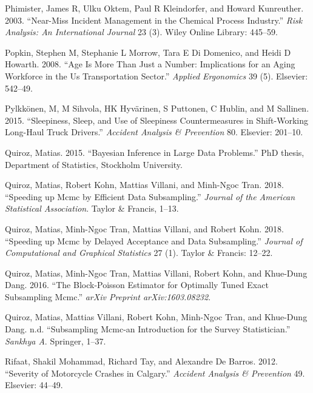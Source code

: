 \documentclass[12pt]{book}
\numberwithin{equation}{chapter}
\begin{document}
\leavevmode\hypertarget{ref-phimister2003near}{}%
Phimister, James R, Ulku Oktem, Paul R Kleindorfer, and Howard Kunreuther. 2003. ``Near-Miss Incident Management in the Chemical Process Industry.'' \emph{Risk Analysis: An International Journal} 23 (3). Wiley Online Library: 445--59.

\leavevmode\hypertarget{ref-popkin2008age}{}%
Popkin, Stephen M, Stephanie L Morrow, Tara E Di Domenico, and Heidi D Howarth. 2008. ``Age Is More Than Just a Number: Implications for an Aging Workforce in the Us Transportation Sector.'' \emph{Applied Ergonomics} 39 (5). Elsevier: 542--49.

\leavevmode\hypertarget{ref-pylkkonen2015sleepiness}{}%
Pylkkönen, M, M Sihvola, HK Hyvärinen, S Puttonen, C Hublin, and M Sallinen. 2015. ``Sleepiness, Sleep, and Use of Sleepiness Countermeasures in Shift-Working Long-Haul Truck Drivers.'' \emph{Accident Analysis \& Prevention} 80. Elsevier: 201--10.

\leavevmode\hypertarget{ref-quiroz2015bayesian}{}%
Quiroz, Matias. 2015. ``Bayesian Inference in Large Data Problems.'' PhD thesis, Department of Statistics, Stockholm University.

\leavevmode\hypertarget{ref-quiroz2018speeding1}{}%
Quiroz, Matias, Robert Kohn, Mattias Villani, and Minh-Ngoc Tran. 2018. ``Speeding up Mcmc by Efficient Data Subsampling.'' \emph{Journal of the American Statistical Association}. Taylor \& Francis, 1--13.

\leavevmode\hypertarget{ref-quiroz2018speeding}{}%
Quiroz, Matias, Minh-Ngoc Tran, Mattias Villani, and Robert Kohn. 2018. ``Speeding up Mcmc by Delayed Acceptance and Data Subsampling.'' \emph{Journal of Computational and Graphical Statistics} 27 (1). Taylor \& Francis: 12--22.

\leavevmode\hypertarget{ref-quiroz2016block}{}%
Quiroz, Matias, Minh-Ngoc Tran, Mattias Villani, Robert Kohn, and Khue-Dung Dang. 2016. ``The Block-Poisson Estimator for Optimally Tuned Exact Subsampling Mcmc.'' \emph{arXiv Preprint arXiv:1603.08232}.

\leavevmode\hypertarget{ref-quirozsubsampling}{}%
Quiroz, Matias, Mattias Villani, Robert Kohn, Minh-Ngoc Tran, and Khue-Dung Dang. n.d. ``Subsampling Mcmc-an Introduction for the Survey Statistician.'' \emph{Sankhya A}. Springer, 1--37.

\leavevmode\hypertarget{ref-rifaat2012severity}{}%
Rifaat, Shakil Mohammad, Richard Tay, and Alexandre De Barros. 2012. ``Severity of Motorcycle Crashes in Calgary.'' \emph{Accident Analysis \& Prevention} 49. Elsevier: 44--49.
\end{document}
